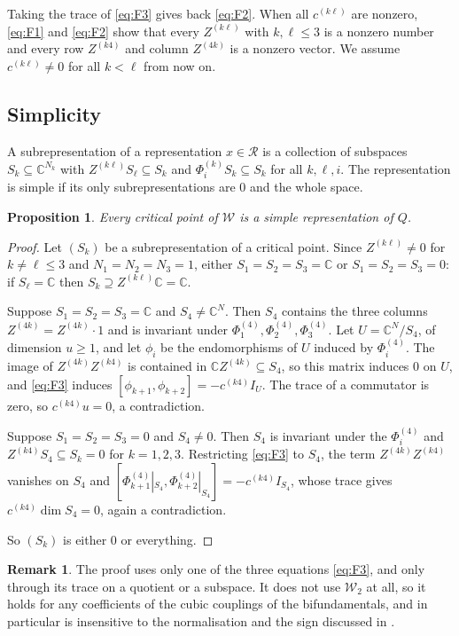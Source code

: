 \documentclass[11pt]{amsart}
\newtheorem{proposition}[theorem]{Proposition}
\theoremstyle{definition}
\newtheorem{remark}[theorem]{Remark}
\newcommand{\CC}{\mathbb{C}}
\newcommand{\cR}{\mathcal R}
\newcommand{\cW}{\mathcal W}
\begin{document}
Taking the trace of \eqref{eq:F3} gives back \eqref{eq:F2}. When all $c^{(k\ell)}$ are nonzero, \eqref{eq:F1} and \eqref{eq:F2} show that every $Z^{(k\ell)}$ with $k,\ell\le 3$ is a nonzero number and every row $Z^{(k4)}$ and column $Z^{(4k)}$ is a nonzero vector. We assume $c^{(k\ell)}\ne0$ for all $k<\ell$ from now on.

\subsection{Simplicity}
A subrepresentation of a representation $x\in\cR$ is a collection of subspaces $S_k\subseteq\CC^{N_k}$ with $Z^{(k\ell)}S_\ell\subseteq S_k$ and $\Phi^{(k)}_iS_k\subseteq S_k$ for all $k,\ell,i$. The representation is simple if its only subrepresentations are $0$ and the whole space.

\begin{proposition}\label{prop:simple}
Every critical point of $\cW$ is a simple representation of $Q$.
\end{proposition}

\begin{proof}
Let $(S_k)$ be a subrepresentation of a critical point. Since $Z^{(k\ell)}\ne0$ for $k\ne\ell\le3$ and $N_1=N_2=N_3=1$, either $S_1=S_2=S_3=\CC$ or $S_1=S_2=S_3=0$: if $S_\ell=\CC$ then $S_k\supseteq Z^{(k\ell)}\CC=\CC$.

Suppose $S_1=S_2=S_3=\CC$ and $S_4\ne\CC^N$. Then $S_4$ contains the three columns $Z^{(4k)}=Z^{(4k)}\cdot 1$ and is invariant under $\Phi^{(4)}_1,\Phi^{(4)}_2,\Phi^{(4)}_3$. Let $U=\CC^N/S_4$, of dimension $u\ge1$, and let $\phi_i$ be the endomorphisms of $U$ induced by $\Phi^{(4)}_i$. The image of $Z^{(4k)}Z^{(k4)}$ is contained in $\CC Z^{(4k)}\subseteq S_4$, so this matrix induces $0$ on $U$, and \eqref{eq:F3} induces $[\phi_{k+1},\phi_{k+2}]=-c^{(k4)}I_U$. The trace of a commutator is zero, so $c^{(k4)}u=0$, a contradiction.

Suppose $S_1=S_2=S_3=0$ and $S_4\ne0$. Then $S_4$ is invariant under the $\Phi^{(4)}_i$ and $Z^{(k4)}S_4\subseteq S_k=0$ for $k=1,2,3$. Restricting \eqref{eq:F3} to $S_4$, the term $Z^{(4k)}Z^{(k4)}$ vanishes on $S_4$ and $[\Phi^{(4)}_{k+1}|_{S_4},\Phi^{(4)}_{k+2}|_{S_4}]=-c^{(k4)}I_{S_4}$, whose trace gives $c^{(k4)}\dim S_4=0$, again a contradiction.

So $(S_k)$ is either $0$ or everything.
\end{proof}

\begin{remark}\label{rem:onetrace}
The proof uses only one of the three equations \eqref{eq:F3}, and only through its trace on a quotient or a subspace. It does not use $\cW_2$ at all, so it holds for any coefficients of the cubic couplings of the bifundamentals, and in particular is insensitive to the normalisation and the sign discussed in \cite{CGMS16}.
\end{remark}
\end{document}
